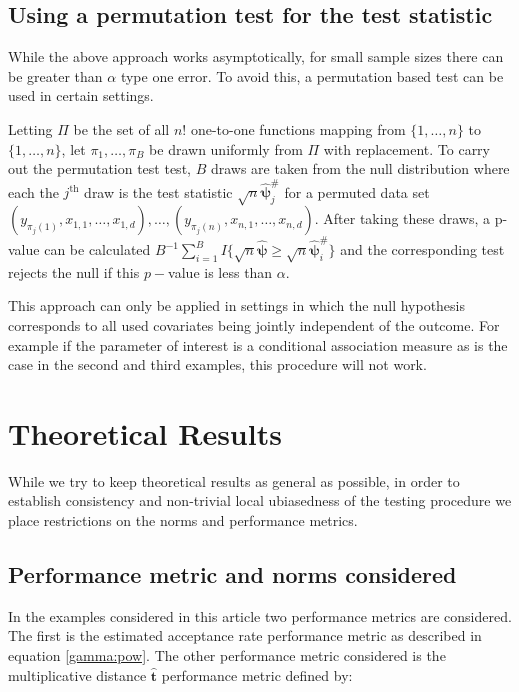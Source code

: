 \documentclass{article}
\newcommand{\tst}{\hat{\boldsymbol{t}}}
\begin{document}
\subsection{Using a permutation test for the test statistic}
While the above approach works asymptotically, for small sample sizes there can be greater than $\alpha$ type one error.  To avoid this, a permutation based test can be used in certain settings. 

Letting $\Pi$ be the set of all $n!$ one-to-one functions mapping from $\{1, \dots, n\}$ to $\{1, \dots, n\}$, let  $\pi_1, \dots, \pi_B$ be drawn uniformly from $\Pi$ with replacement. To carry out the permutation test test, $B$ draws are taken from the null distribution where each the $j^{\text{th}}$ draw is the test statistic $\sqrt{n}\hat{\boldsymbol{\psi}}^{\#}_j$ for a permuted data set $(y_{\pi_j(1)}, x_{1, 1}, \dots, x_{1, d}), \dots, (y_{\pi_j(n)}, x_{n, 1}, \dots, x_{n, d})$.  After taking these draws, a p-value can be calculated $B^{-1}\sum_{i = 1}^B I\{\sqrt{n}\hat{\boldsymbol{\psi}} \geq \sqrt{n}\hat{\boldsymbol{\psi}}^{\#}_i\}$ and the corresponding test rejects the null if this $p-$value is less than $\alpha$. 

This approach can only be applied in settings in which the null hypothesis corresponds to all used covariates being jointly independent of the outcome.  For example if the parameter of interest is a conditional association measure as is the case in the second and third examples, this procedure will not work.  


\section{Theoretical Results}
\label{sec:theorems}
While we try to keep theoretical results as general as possible, in order to establish consistency and  non-trivial local ubiasedness of the testing procedure we place restrictions on the norms and performance metrics. 

\subsection*{Performance metric and norms considered}
In the examples considered in this article two performance metrics are considered.  The first is the estimated acceptance rate performance metric as described in equation \eqref{gamma:pow}.  The other performance metric considered is the multiplicative distance $\tst$  performance metric defined by:
\end{document}
